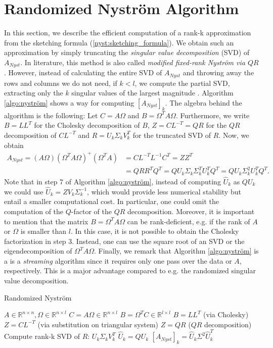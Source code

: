 \documentclass{article}
\theoremstyle{definition}
\begin{document}
\section{Randomized Nyström Algorithm}\label{sec:rand_nystrom_alg}
In this section, we describe the efficient computation of a rank-k approximation from the sketching formula (\ref{nyst:sketching_formula}). We obtain such an approximation by simply truncating the \textit{singular value decomposition} (SVD) of $A_{Nyst}$. In literature, this method is also called \textit{modified fixed-rank Nyström via $QR$}. However, instead of calculating the entire SVD of $A_{Nyst}$ and throwing away the rows and columns we do not need, if $k<l$, we compute the partial SVD, extracting only the $k$ singular values of the largest magnitude \cite{scipy_svds}. Algorithm \ref{algo:nyström} shows a way for computing $[A_{Nyst}]_k$. The algebra behind the algorithm is the following: Let $C = A \Omega$ and $B = \Omega^T A \Omega$. Furthermore, we write $B = LL^T$ for the Cholesky decomposition of $B$, $Z = C L^{-T} = QR$ for the $QR$ decomposition of $C L^{-T}$ and $R = U_k \Sigma_k V_k^T$ for the truncated SVD of $R$. Now, we obtain
\begin{align*}
    A_{Nyst} = (A \Omega) (\Omega^T A \Omega)^+ (\Omega^T A) &= CL^{-T}L^{-1}C^T = ZZ^T \\
    &= QRR^TQ^T = QU_k\Sigma_k \Sigma_k^T U_k^TQ^T = QU_k\Sigma_k^2 U_k^TQ^T.
\end{align*}
 Note that in step 7 of Algorithm \ref{algo:nyström}, instead of computing $\hat{U}_k$ as $Q U_k$ we could use $\hat{U}_k = Z V_k \Sigma_k^{-1}$, which would provide less numerical stability but entail a smaller computational cost. In particular, one could omit the computation of the $Q$-factor of the $QR$ decomposition. Moreover, it is important to mention that the matrix $B = \Omega^T A \Omega$ can be rank-deficient, e.g. if the rank of $A$ or $\Omega$ is smaller than $l$. In this case, it is not possible to obtain the Cholesky factorization in step 3. Instead, one can use the square root of an SVD or the eigendecomposition of $\Omega^T A \Omega$. Finally, we remark that Algorithm \ref{algo:nyström} is a is a \textit{streaming} algorithm since it requires only one pass over the data or $A$, respectively. This is a major advantage compared to e.g. the randomized singular value decomposition.
\begin{algorithm}[H]
    \caption{Randomized Nyström} \label{algo:nyström}
    \begin{algorithmic}[1]
        \Require $A \in \mathbb{R}^{n \times n}, \Omega \in \mathbb{R}^{n \times l}$
        \State $C = A \Omega \in \mathbb{R}^{n \times l}$
        \State $B = \Omega^T C \in \mathbb{R}^{l \times l}$
        \State $B = LL^T$ (via Cholesky)
        \State $Z = C L^{-T}$ (via substitution on triangular system)
        \State $Z = QR$ ($QR$ decomposition)
        \State Compute rank-k SVD of $R$: $U_k \Sigma_k V_k^T$
        \State $\hat{U}_k = Q U_k$
        \Ensure $[A_{Nyst}]_k = \hat{U}_k \Sigma^2 \hat{U}_k^T$
    \end{algorithmic}
\end{algorithm}
\end{document}
